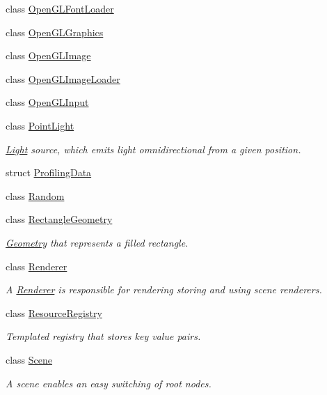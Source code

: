 \begin{DoxyCompactItemize}
\item 
class \mbox{\hyperlink{classec_1_1_open_g_l_font_loader}{Open\+G\+L\+Font\+Loader}}
\item 
class \mbox{\hyperlink{classec_1_1_open_g_l_graphics}{Open\+G\+L\+Graphics}}
\item 
class \mbox{\hyperlink{classec_1_1_open_g_l_image}{Open\+G\+L\+Image}}
\item 
class \mbox{\hyperlink{classec_1_1_open_g_l_image_loader}{Open\+G\+L\+Image\+Loader}}
\item 
class \mbox{\hyperlink{classec_1_1_open_g_l_input}{Open\+G\+L\+Input}}
\item 
class \mbox{\hyperlink{classec_1_1_point_light}{Point\+Light}}
\begin{DoxyCompactList}\small\item\em \mbox{\hyperlink{classec_1_1_light}{Light}} source, which emits light omnidirectional from a given position. \end{DoxyCompactList}\item 
struct \mbox{\hyperlink{structec_1_1_profiling_data}{Profiling\+Data}}
\item 
class \mbox{\hyperlink{classec_1_1_random}{Random}}
\item 
class \mbox{\hyperlink{classec_1_1_rectangle_geometry}{Rectangle\+Geometry}}
\begin{DoxyCompactList}\small\item\em \mbox{\hyperlink{classec_1_1_geometry}{Geometry}} that represents a filled rectangle. \end{DoxyCompactList}\item 
class \mbox{\hyperlink{classec_1_1_renderer}{Renderer}}
\begin{DoxyCompactList}\small\item\em A \mbox{\hyperlink{classec_1_1_renderer}{Renderer}} is responsible for rendering storing and using scene renderers. \end{DoxyCompactList}\item 
class \mbox{\hyperlink{classec_1_1_resource_registry}{Resource\+Registry}}
\begin{DoxyCompactList}\small\item\em Templated registry that stores key value pairs. \end{DoxyCompactList}\item 
class \mbox{\hyperlink{classec_1_1_scene}{Scene}}
\begin{DoxyCompactList}\small\item\em A scene enables an easy switching of root nodes. \end{DoxyCompactList}\item 

\end{DoxyCompactItemize}
